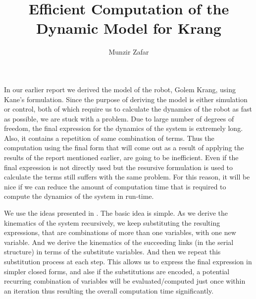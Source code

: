 \documentclass[a4paper,10pt]{article}
\title{Efficient Computation of the Dynamic Model for Krang}
\author{Munzir Zafar}
\begin{document}
\maketitle

In our earlier report we derived the model of the robot, Golem Krang, using Kane's formulation. Since the purpose of deriving the model
is either simulation or control, both of which require us to calculate the dynamics of the robot as fast as possible, we are stuck with a problem.
Due to large number of degrees of freedom, the final expression for the dynamics of the system is extremely long. Also, it contains a repetition
of same combination of terms. Thus the computation using the final form that will come out as a result of applying the results of the report
mentioned earlier, are going to be inefficient. Even if the final expression is not directly used but the resursive formulation is used to 
calculate the terms still suffers with the same problem. For this reason, it will be nice if we can reduce the amount of computation time
that is required to compute the dynamics of the system in run-time.

We use the ideas presented in \cite{kane1983use}. The basic idea is simple. As we derive the kinematics of the system recursively, we keep substituting the resulting expressions,
that are combinations of more than one variables, with one new variable. And we derive the kinematics of the succeeding links (in the serial structure) in terms 
of the substitute variables. And then we repeat this substitution process at each step. This allows us to express the final expression in simpler closed forms,
and alse if the substitutions are encoded, a potential recurring combination of variables will be evaluated/computed just once within an iteration thus
resulting the overall computation time significantly.




\tiny




\end{document}
